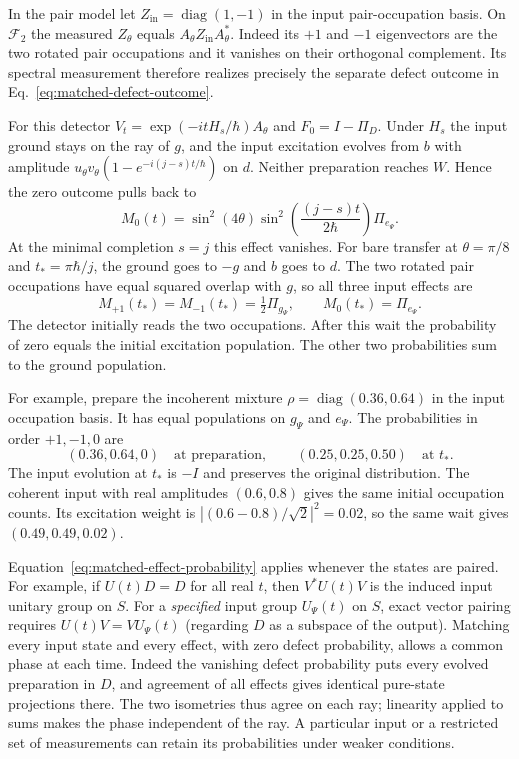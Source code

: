 \documentclass[11pt]{article}
\theoremstyle{definition}
\begin{document}
In the pair model let $Z_{\mathrm{in}}=\operatorname{diag}(1,-1)$ in the input pair-occupation basis. On $\mathcal F_2$ the measured $Z_\theta$ equals $A_\theta Z_{\mathrm{in}}A_\theta^*$. Indeed its $+1$ and $-1$ eigenvectors are the two rotated pair occupations and it vanishes on their orthogonal complement. Its spectral measurement therefore realizes precisely the separate defect outcome in Eq.~\eqref{eq:matched-defect-outcome}.

For this detector $V_t=\exp(-itH_s/\hbar)A_\theta$ and $F_0=I-\Pi_D$. Under $H_s$ the input ground stays on the ray of $g$, and the input excitation evolves from $b$ with amplitude $u_\theta v_\theta(1-e^{-i(j-s)t/\hbar})$ on $d$. Neither preparation reaches $W$. Hence the zero outcome pulls back to
\begin{equation}
 M_0(t)=\sin^2(4\theta)\sin^2\!\left(\frac{(j-s)t}{2\hbar}\right)\Pi_{e_\Psi}.
 \label{eq:pair-detector-pullback}
\end{equation}
At the minimal completion $s=j$ this effect vanishes. For bare transfer at $\theta=\pi/8$ and $t_*=\pi\hbar/j$, the ground goes to $-g$ and $b$ goes to $d$. The two rotated pair occupations have equal squared overlap with $g$, so all three input effects are
\begin{equation}
 M_{+1}(t_*)=M_{-1}(t_*)=\tfrac12\Pi_{g_\Psi},\qquad M_0(t_*)=\Pi_{e_\Psi}.
 \label{eq:pair-transfer-povm}
\end{equation}
The detector initially reads the two occupations. After this wait the probability of zero equals the initial excitation population. The other two probabilities sum to the ground population.

For example, prepare the incoherent mixture $\rho=\operatorname{diag}(0.36,0.64)$ in the input occupation basis. It has equal populations on $g_\Psi$ and $e_\Psi$. The probabilities in order $+1,-1,0$ are
\begin{equation}
 (0.36,0.64,0)\quad\text{at preparation},\qquad
 (0.25,0.25,0.50)\quad\text{at }t_* .
 \label{eq:pair-matched-probabilities}
\end{equation}
The input evolution at $t_*$ is $-I$ and preserves the original distribution. The coherent input with real amplitudes $(0.6,0.8)$ gives the same initial occupation counts. Its excitation weight is $|(0.6-0.8)/\sqrt2|^2=0.02$, so the same wait gives $(0.49,0.49,0.02)$.

Equation~\eqref{eq:matched-effect-probability} applies whenever the states are paired. For example, if $U(t)D=D$ for all real $t$, then $V^*U(t)V$ is the induced input unitary group on $S$. For a \emph{specified} input group $U_\Psi(t)$ on $S$, exact vector pairing requires $U(t)V=VU_\Psi(t)$ (regarding $D$ as a subspace of the output). Matching every input state and every effect, with zero defect probability, allows a common phase at each time. Indeed the vanishing defect probability puts every evolved preparation in $D$, and agreement of all effects gives identical pure-state projections there. The two isometries thus agree on each ray; linearity applied to sums makes the phase independent of the ray. A particular input or a restricted set of measurements can retain its probabilities under weaker conditions.
\end{document}
